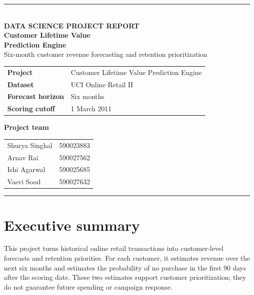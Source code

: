\documentclass[11pt,a4paper]{article}
\begin{document}
\begin{titlepage}
  \thispagestyle{empty}
  \vspace*{1.15in}
  {\color{Blue}\rule{\textwidth}{2pt}}\\[0.35in]
  {\Large\color{Blue}\bfseries DATA SCIENCE PROJECT REPORT}\\[0.25in]
  {\Huge\color{Navy}\bfseries Customer Lifetime Value\\[0.08in]
   Prediction Engine}\\[0.25in]
  {\Large\color{Muted}Six-month customer revenue forecasting and retention prioritization}\\[0.55in]

  \begin{tabularx}{\textwidth}{@{}>{\bfseries\color{Navy}}l Y@{}}
    Project & Customer Lifetime Value Prediction Engine\\
    Dataset & UCI Online Retail II\\
    Forecast horizon & Six months\\
    Scoring cutoff & 1 March 2011\\
  \end{tabularx}

  \vfill
  {\large\bfseries\color{Navy}Project team}\\[0.12in]
  \begin{tabularx}{\textwidth}{@{}Y r@{}}
    Shurya Singhal & 590023883\\
    Arnav Rai & 590027562\\
    Ishi Agarwal & 590025685\\
    Vasvi Sood & 590027632\\
  \end{tabularx}
  \vspace{0.35in}
  {\color{Blue}\rule{\textwidth}{2pt}}
\end{titlepage}

\tableofcontents
\clearpage
{}

\section{Executive summary}

This project turns historical online retail transactions into customer-level
forecasts and retention priorities. For each customer, it estimates revenue
over the next six months and estimates the probability of no purchase in the
first 90 days after the scoring date. These two estimates support customer
prioritization; they do not guarantee future spending or campaign response.
\end{document}
